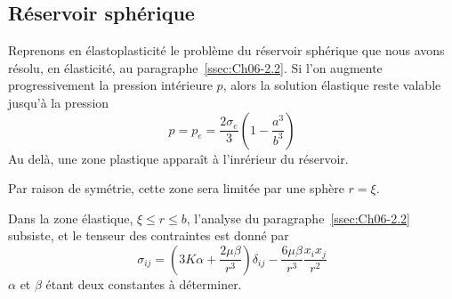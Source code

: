 \subsection{Réservoir sphérique} \label{ssec:Ch10-2.2}
Reprenons en élastoplasticité le problème du réservoir sphérique que nous avons résolu, en élasticité, au paragraphe~\ref{ssec:Ch06-2.2}.
Si l'on augmente progressivement la pression intérieure $p$, alors la solution élastique reste valable jusqu'à la pression 
\begin{equation}
    p = p_e = \frac{2\sigma_e}{3} \left( 1 - \frac{a^3}{b^3} \right)
    \label{eq:Ch10-032}
\end{equation}
Au delà, une zone plastique apparaît à l'inrérieur du réservoir. 
\begin{multicols}{2}
    \begin{center}
    \end{center}
    \columnbreak
    Par raison de symétrie, cette zone sera limitée par une sphère $r=\xi$.
\end{multicols}
Dans la zone élastique, $\xi \leq r \leq b$, l'analyse du paragraphe~\ref{ssec:Ch06-2.2} subsiste, et le tenseur des contraintes est donné par 
\begin{equation}
    \sigma_{ij} = \left( 3 K \alpha + \frac{2\mu \beta}{r^3} \right) \delta_{ij} - \frac{6\mu \beta}{r^3} \frac{x_ix_j}{r^2}
    \label{eq:Ch10-033}
\end{equation}
$\alpha$ et $\beta$ étant deux constantes à déterminer.

